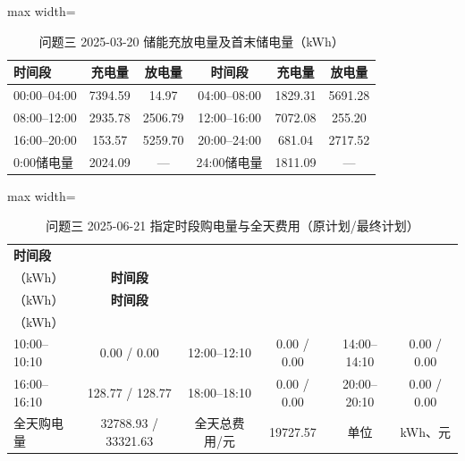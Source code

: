 \documentclass[UTF8,a4paper,zihao=-4,fontset=windows]{ctexart}
\begin{document}
\begin{table}[H]\centering
\fontsize{9.5}{12}\selectfont\setlength{\tabcolsep}{4pt}\renewcommand{\arraystretch}{1.12}
\begin{adjustbox}{max width=\linewidth}\begin{tabular}{lccccc}\toprule
\textbf{时间段} & \textbf{充电量} & \textbf{放电量} & \textbf{时间段} & \textbf{充电量} & \textbf{放电量}\\\midrule
00:00–04:00 & 7394.59 & 14.97 & 04:00–08:00 & 1829.31 & 5691.28\\
08:00–12:00 & 2935.78 & 2506.79 & 12:00–16:00 & 7072.08 & 255.20\\
16:00–20:00 & 153.57 & 5259.70 & 20:00–24:00 & 681.04 & 2717.52\\
0:00储电量 & 2024.09 & — & 24:00储电量 & 1811.09 & —\\
\bottomrule\end{tabular}\end{adjustbox}
\caption{问题三 2025-03-20 储能充放电量及首末储电量（kWh）}
\end{table}
\begin{table}[H]\centering
\fontsize{9.5}{12}\selectfont\setlength{\tabcolsep}{4pt}\renewcommand{\arraystretch}{1.12}
\begin{adjustbox}{max width=\linewidth}\begin{tabular}{lccccc}\toprule
\textbf{时间段} & \shortstack{\textbf{购电量}\\{\normalfont （kWh）}} & \textbf{时间段} & \shortstack{\textbf{购电量}\\{\normalfont （kWh）}} & \textbf{时间段} & \shortstack{\textbf{购电量}\\{\normalfont （kWh）}}\\\midrule
10:00–10:10 & 0.00 / 0.00 & 12:00–12:10 & 0.00 / 0.00 & 14:00–14:10 & 0.00 / 0.00\\
16:00–16:10 & 128.77 / 128.77 & 18:00–18:10 & 0.00 / 0.00 & 20:00–20:10 & 0.00 / 0.00\\
全天购电量 & 32788.93 / 33321.63 & 全天总费用/元 & 19727.57 & 单位 & kWh、元\\
\bottomrule\end{tabular}\end{adjustbox}
\caption{问题三 2025-06-21 指定时段购电量与全天费用（原计划/最终计划）}
\end{table}
\end{document}
